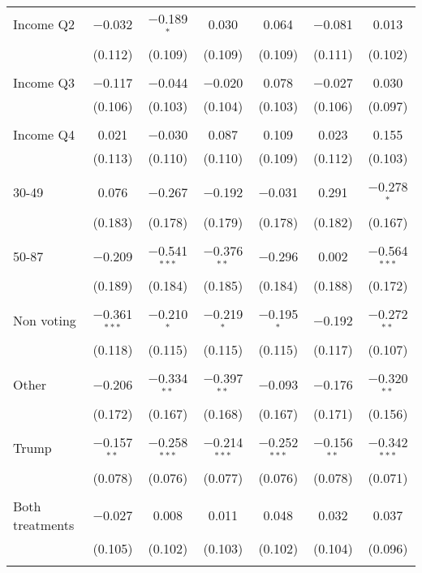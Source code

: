 \begin{tabular}{@{\extracolsep{5pt}}lcccccc}
 Income Q2 & $-$0.032 & $-$0.189$^{*}$ & 0.030 & 0.064 & $-$0.081 & 0.013 \\ 
  & (0.112) & (0.109) & (0.109) & (0.109) & (0.111) & (0.102) \\ 
  & & & & & & \\ 
 Income Q3 & $-$0.117 & $-$0.044 & $-$0.020 & 0.078 & $-$0.027 & 0.030 \\ 
  & (0.106) & (0.103) & (0.104) & (0.103) & (0.106) & (0.097) \\ 
  & & & & & & \\ 
 Income Q4 & 0.021 & $-$0.030 & 0.087 & 0.109 & 0.023 & 0.155 \\ 
  & (0.113) & (0.110) & (0.110) & (0.109) & (0.112) & (0.103) \\ 
  & & & & & & \\ 
 30-49 & 0.076 & $-$0.267 & $-$0.192 & $-$0.031 & 0.291 & $-$0.278$^{*}$ \\ 
  & (0.183) & (0.178) & (0.179) & (0.178) & (0.182) & (0.167) \\ 
  & & & & & & \\ 
 50-87 & $-$0.209 & $-$0.541$^{***}$ & $-$0.376$^{**}$ & $-$0.296 & 0.002 & $-$0.564$^{***}$ \\ 
  & (0.189) & (0.184) & (0.185) & (0.184) & (0.188) & (0.172) \\ 
  & & & & & & \\ 
 Non voting & $-$0.361$^{***}$ & $-$0.210$^{*}$ & $-$0.219$^{*}$ & $-$0.195$^{*}$ & $-$0.192 & $-$0.272$^{**}$ \\ 
  & (0.118) & (0.115) & (0.115) & (0.115) & (0.117) & (0.107) \\ 
  & & & & & & \\ 
 Other & $-$0.206 & $-$0.334$^{**}$ & $-$0.397$^{**}$ & $-$0.093 & $-$0.176 & $-$0.320$^{**}$ \\ 
  & (0.172) & (0.167) & (0.168) & (0.167) & (0.171) & (0.156) \\ 
  & & & & & & \\ 
 Trump & $-$0.157$^{**}$ & $-$0.258$^{***}$ & $-$0.214$^{***}$ & $-$0.252$^{***}$ & $-$0.156$^{**}$ & $-$0.342$^{***}$ \\ 
  & (0.078) & (0.076) & (0.077) & (0.076) & (0.078) & (0.071) \\ 
  & & & & & & \\ 
 Both treatments & $-$0.027 & 0.008 & 0.011 & 0.048 & 0.032 & 0.037 \\ 
  & (0.105) & (0.102) & (0.103) & (0.102) & (0.104) & (0.096) \\ 
  & & & & & & \\ 

\end{tabular}
